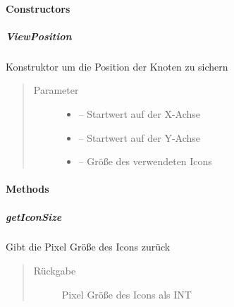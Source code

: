 \documentclass[letterpaper,10pt,ngerman]{sphinxmanual}
\begin{document}
\paragraph{Constructors}
\label{\detokenize{com/linuxluigi/edu/data/ViewPosition:constructors}}

\subparagraph{ViewPosition}
\label{\detokenize{com/linuxluigi/edu/data/ViewPosition:id1}}

\begin{fulllineitems}
\label{\detokenize{com/linuxluigi/edu/data/ViewPosition:com.linuxluigi.edu.data.ViewPosition.ViewPosition(int, int, int)}}
Konstruktor um die Position der Knoten zu sichern
\begin{quote}\begin{description}
\item[{Parameter}] \leavevmode\begin{itemize}
\item {} 
 -- Startwert auf der X-Achse

\item {} 
 -- Startwert auf der Y-Achse

\item {} 
 -- Größe des verwendeten Icons

\end{itemize}

\end{description}\end{quote}

\end{fulllineitems}



\paragraph{Methods}
\label{\detokenize{com/linuxluigi/edu/data/ViewPosition:methods}}

\subparagraph{getIconSize}
\label{\detokenize{com/linuxluigi/edu/data/ViewPosition:geticonsize}}

\begin{fulllineitems}
\label{\detokenize{com/linuxluigi/edu/data/ViewPosition:com.linuxluigi.edu.data.ViewPosition.getIconSize()}}
Gibt die Pixel Größe des Icons zurück
\begin{quote}\begin{description}
\item[{Rückgabe}] \leavevmode
Pixel Größe des Icons als INT

\end{description}\end{quote}

\end{fulllineitems}
\end{document}
